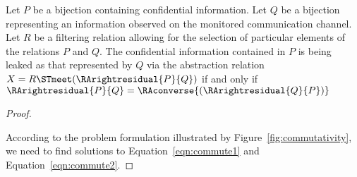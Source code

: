 \begin{corollary}
\label{cor:compute_bij}
	Let $P$ be a bijection containing confidential information. Let $Q$ be a bijection representing an information observed on the monitored communication channel. Let $R$ be a filtering relation allowing for the selection of particular elements of the relations $P$ and $Q$. The confidential information contained in $P$ is being leaked as that represented by $Q$ via the abstraction relation $X = R \STmeet (\RArightresidual{P}{Q})$ if and only if  $\RArightresidual{P}{Q} = \RAconverse{(\RArightresidual{Q}{P})}$
	
\begin{proof}~
	
	According to the problem formulation illustrated by Figure~\ref{fig:commutativity}, we need to find solutions to Equation~\ref{eqn:commute1} and Equation~\ref{eqn:commute2}. \newline
	

\end{proof}
\end{corollary}
